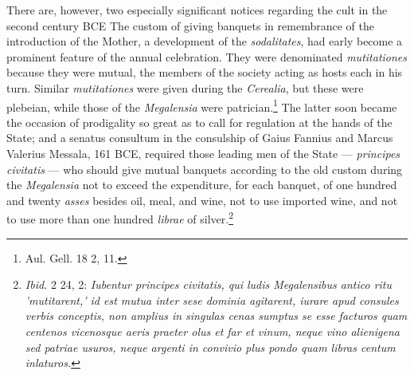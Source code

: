 \documentclass[a4paper, 11pt, oneside, polutonikogreek, english]{article}
\begin{document}
There are, however, two especially significant notices regarding the cult in the second century \textsc{BCE} The custom of giving banquets in remembrance of the introduction of the Mother, a development of the \emph{sodalitates}, had early become a prominent feature of the annual celebration. They were denominated \emph{mutitationes} because they were mutual, the members of the society acting as hosts each in his turn. Similar \emph{mutitationes} were given during the \emph{Cerealia}, but these were plebeian, while those of the \emph{Megalensia} were patrician.\footnote{Aul. Gell. 18 2, 11.} The latter soon became the occasion of prodigality so great as to call for regulation at the hands of the State; and a senatus consultum in the consulship of Gaius Fannius and Marcus Valerius Messala, 161 \textsc{BCE}, required those leading men of the State --- \emph{principes civitatis} --- who should give mutual banquets according to the old custom during the \emph{Megalensia} not to exceed the expenditure, for each banquet, of one hundred and twenty \emph{asses} besides oil, meal, and wine, not to use imported wine, and not to use more than one hundred \emph{librae} of silver.\footnote{\emph{Ibid.} 2 24, 2: \emph{Iubentur principes civitatis, qui ludis Megalensibus antico ritu 'mutitarent,' id est mutua inter sese dominia agitarent, iurare apud consules verbis conceptis, non amplius in singulas cenas sumptus se esse facturos quam centenos vicenosque aeris praeter olus et far et vinum, neque vino alienigena sed patriae usuros, neque argenti in convivio plus pondo quam libras centum inlaturos.}}
\end{document}
